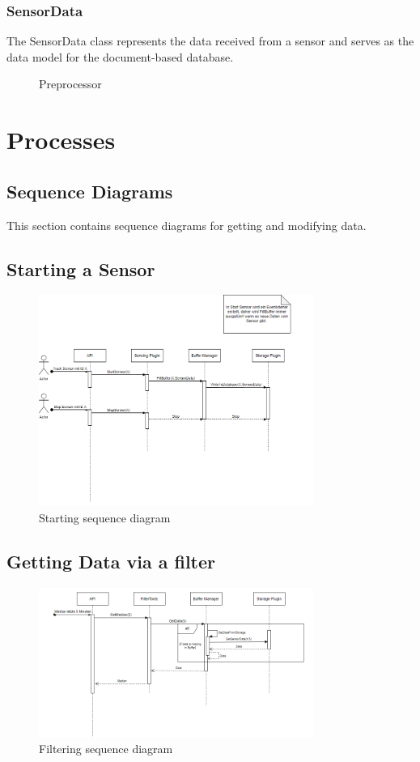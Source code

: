 \documentclass[12pt]{article}
\newcounter{fr}
\begin{document}
\subsubsection{SensorData}
The SensorData class represents the data received from a sensor and serves as the data model for the document-based database.
\begin{figure}[ht]
\centering

\caption{\label{fig:bild16} Preprocessor}
\end{figure}

\newpage
\section{Processes}
\subsection{Sequence Diagrams}
This section contains sequence diagrams for getting and modifying data.
\subsection{Starting a Sensor}
\begin{figure}[ht]
\centering
\includegraphics[width=0.8\textwidth]{Graphics/SeqStart.png}
\caption{\label{fig:bild17} Starting sequence diagram}
\end{figure}

\newpage
\subsection{Getting Data via a filter}
\begin{figure}[ht]
\centering
\includegraphics[width=0.8\textwidth]{Graphics/SeqFilter.png}
\caption{\label{fig:bild18} Filtering sequence diagram}
\end{figure}
\end{document}

